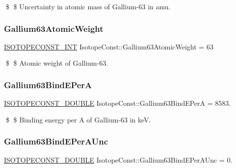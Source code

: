 \$ \$ Uncertainty in atomic mass of Gallium-\/63 in amu. \mbox{\label{group___isotope_const-_gallium-_ga63_ga3cd1071c668d00bfabca97cda3b48207}} 
\subsubsection{\texorpdfstring{Gallium63\+Atomic\+Weight}{Gallium63AtomicWeight}}
{\footnotesize\ttfamily \mbox{\hyperlink{group___isotope_const-_macros_ga5f18360b3e99483a35c32d789e62621c}{I\+S\+O\+T\+O\+P\+E\+C\+O\+N\+S\+T\+\_\+\+I\+NT}} Isotope\+Const\+::\+Gallium63\+Atomic\+Weight = 63}

\$ \$ Atomic weight of Gallium-\/63. \mbox{\label{group___isotope_const-_gallium-_ga63_ga89d4122bfc5a1d6118de3ebc5d2dae21}} 
\subsubsection{\texorpdfstring{Gallium63\+Bind\+E\+PerA}{Gallium63BindEPerA}}
{\footnotesize\ttfamily \mbox{\hyperlink{group___isotope_const-_macros_ga8f45a7272ce02c0b4c65c44636ed719a}{I\+S\+O\+T\+O\+P\+E\+C\+O\+N\+S\+T\+\_\+\+D\+O\+U\+B\+LE}} Isotope\+Const\+::\+Gallium63\+Bind\+E\+PerA = 8583.}

\$ \$ Binding energy per A of Gallium-\/63 in keV. \mbox{\label{group___isotope_const-_gallium-_ga63_gafc0f1e15a7f304e22f599fe5965f9b80}} 
\subsubsection{\texorpdfstring{Gallium63\+Bind\+E\+Per\+A\+Unc}{Gallium63BindEPerAUnc}}
{\footnotesize\ttfamily \mbox{\hyperlink{group___isotope_const-_macros_ga8f45a7272ce02c0b4c65c44636ed719a}{I\+S\+O\+T\+O\+P\+E\+C\+O\+N\+S\+T\+\_\+\+D\+O\+U\+B\+LE}} Isotope\+Const\+::\+Gallium63\+Bind\+E\+Per\+A\+Unc = 0.}

